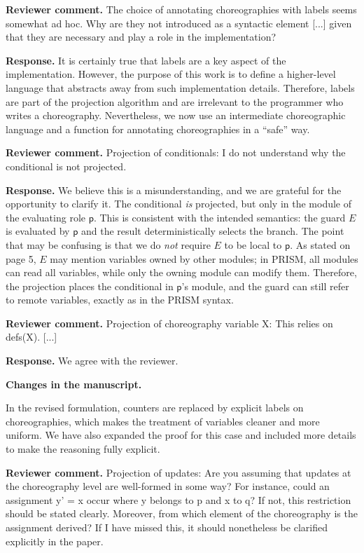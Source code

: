 \documentclass[11pt]{article}
\newcommand{\revcomment}[1]{%
  \begin{reviewercomment}
  \textbf{Reviewer comment.} #1
  \end{reviewercomment}
}
\newcommand{\revresponse}[2][]{%
  \par\noindent\textbf{Response.} #1 #2
}
\newcommand{\revchanges}[2][]{%
  \par\noindent\textbf{Changes in the manuscript.} #1
  #2\par\bigskip
}
\begin{document}
\revcomment{
The choice of annotating choreographies with labels seems somewhat ad hoc. Why are they not introduced as a syntactic element [...] given that they are necessary and play a role in the implementation?
}

\revresponse{ It is certainly true that labels are a key aspect of the
  implementation. However, the purpose of this work is to define a
  higher-level language that abstracts away from such implementation
  details. Therefore, labels are part of the projection algorithm and
  are irrelevant to the programmer who writes a
  choreography. Nevertheless, we now use an intermediate choreographic
  language and a function for annotating choreographies in a ``safe''
  way. }


\revcomment{
Projection of conditionals: I do not understand why the conditional is not projected.
}

\revresponse{
We believe this is a misunderstanding, and we are grateful for the opportunity to clarify it. The conditional \emph{is} projected, but only in the module of the evaluating role $\mathsf p$. This is consistent with the intended semantics: the guard $E$ is evaluated by $\mathsf p$ and the result deterministically selects the branch. The point that may be confusing is that we do \emph{not} require $E$ to be local to $\mathsf p$. As stated on page 5, $E$ may mention variables owned by other modules; in PRISM, all modules can read all variables, while only the owning module can modify them. Therefore, the projection places the conditional in $\mathsf p$'s module, and the guard can still refer to remote variables, exactly as in the PRISM syntax.
}

\revcomment{
Projection of choreography variable X: This relies on defs(X). [...]
}

\revresponse{
We agree with the reviewer. }

\revchanges{
In the revised formulation, counters are replaced by
explicit labels on choreographies, which makes the treatment of variables cleaner and more uniform. We have also expanded the proof for this case and
included more details to make the reasoning fully explicit.
}


\revcomment{
Projection of updates: Are you assuming that updates at the choreography level are well-formed in some way? For instance, could an assignment y' = x occur where y belongs to p and x to q? If not, this restriction should be stated clearly. Moreover, from which element of the choreography is the assignment derived? If I have missed this, it should nonetheless be clarified explicitly in the paper.
}
\end{document}
